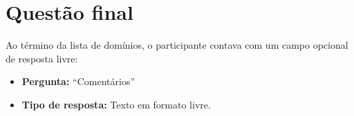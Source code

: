 \section*{Questão final}
Ao término da lista de domínios, o participante contava com um campo opcional de resposta livre:
\begin{itemize}
    \item \textbf{Pergunta:} ``Comentários''
    \item \textbf{Tipo de resposta:} Texto em formato livre.
\end{itemize}